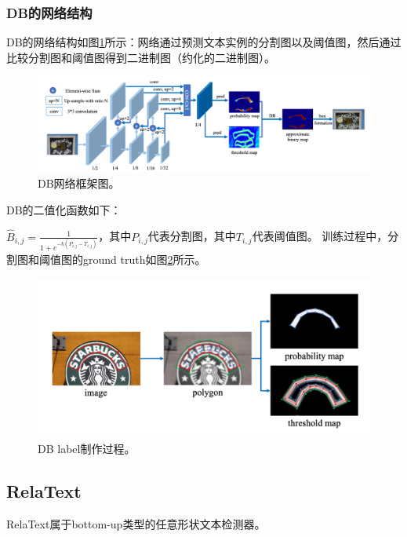 \subsubsection{DB的网络结构}
DB的网络结构如图\ref{db_framework}所示：网络通过预测文本实例的分割图以及阈值图，然后通过比较分割图和阈值图得到二进制图（约化的二进制图）。
\begin{figure}[H]
    \centering
    \includegraphics[width=.98\textwidth]{figure/detection/db_framework.png} 
    \caption{DB网络框架图。} 
    \label{db_framework} 
\end{figure}

DB的二值化函数如下：

$\hat{B}_{i,j} = \frac{1}{1 + e^{-k(P_{i,j} - T_{i,j})}}$，其中$P_{i,j}$代表分割图，其中$T_{i,j}$代表阈值图。
训练过程中，分割图和阈值图的ground truth如图\ref{db_gt}所示。
\begin{figure}[H]
    \centering
    \includegraphics[width=.8\textwidth]{figure/detection/db_gt.png} 
    \caption{DB label制作过程。} 
    \label{db_gt} 
\end{figure}

\subsection{RelaText}
RelaText\cite{ma2020relatext}属于bottom-up类型的任意形状文本检测器。


